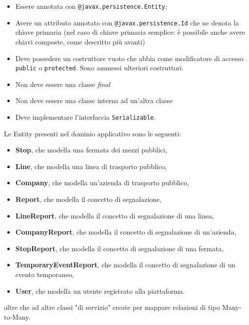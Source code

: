         \begin{itemize}
            \item Essere annotata con \texttt{@javax.persistence.Entity};
            \item Avere un attributo annotato con \texttt{@javax.persistence.Id} che ne denota la chiave primaria (nel caso di chiave primaria semplice: è possibile anche avere chiavi composte, come descritto più avanti)
            \item Deve possedere un costruttore vuoto che abbia come modificatore di accesso \texttt{public} o \texttt{protected}. Sono ammessi ulteriori costruttori.
            \item Non deve essere una classe \textit{final}
            \item Non deve essere una classe interna ad un'altra classe
            \item Deve implementare l'interfaccia \texttt{Serializable}.
        \end{itemize}

        Le Entity presenti nel dominio applicativo sono le seguenti:

        \begin{itemize}
            \item \textbf{Stop}, che modella una fermata dei mezzi pubblici,
            \item \textbf{Line}, che modella una linea di trasporto pubblico,
            \item \textbf{Company}, che modella un'azienda di trasporto pubblico,
            \item \textbf{Report}, che modella il concetto di segnalazione,
            \item \textbf{LineReport}, che modella il concetto di segnalazione di una linea,
            \item \textbf{CompanyReport}, che modella il concetto di segnalazione di un'azienda,
            \item \textbf{StopReport}, che modella il concetto di segnalazione di una fermata,
            \item \textbf{TemporaryEventReport}, che modella il concetto di segnalazione di un evento temporaneo,
            \item \textbf{User}, che modella un utente registrato alla piattaforma.
        \end{itemize}

        oltre che ad altre classi "di servizio" create per mappare relazioni di tipo Many-to-Many.

